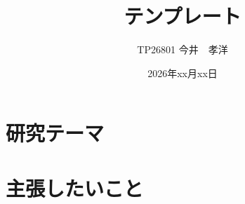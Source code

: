 \documentclass[11pt, a4j]{jarticle}
\begin{document}
\title{テンプレート\\
\Large{}}
\author{TP26801 今井　孝洋}
\date{2026年xx月xx日}
\maketitle
\pagestyle{fancy}


\section{研究テーマ}


\section{主張したいこと}









\end{document}
